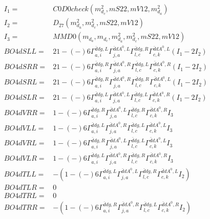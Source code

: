 \documentclass[A4,landscape]{article}
\begin{document}
\begin{align} 
I_1 = & C0D0check(m^2_{d_{{c}}}, mS22, mV12, m^2_{d_{{a}}}) \\ 
I_2 = & D_{27}(m^2_{d_{{a}}}, m^2_{d_{{c}}}, mS22, mV12) \\ 
I_3 = & MMD0(m_{d_{{a}}}, m_{d_{{c}}}, m^2_{d_{{a}}}, m^2_{d_{{c}}}, mS22, mV12) \\ 
  BO4dSLL= & 2   1
-(-)
  6 \Gamma^{\bar{d}d g ,L}_{a, i} \Gamma^{\bar{d}d A^0 ,L}_{j, a} \Gamma^{\bar{d}d g ,R}_{l, c} \Gamma^{\bar{d}d A^0 ,L}_{c, k} (I_1 - 2 I_2) \\ 
  BO4dSRR= & 2   1
-(-)
  6 \Gamma^{\bar{d}d g ,R}_{a, i} \Gamma^{\bar{d}d A^0 ,R}_{j, a} \Gamma^{\bar{d}d g ,L}_{l, c} \Gamma^{\bar{d}d A^0 ,R}_{c, k} (I_1 - 2 I_2) \\ 
  BO4dSRL= & 2   1
-(-)
  6 \Gamma^{\bar{d}d g ,R}_{a, i} \Gamma^{\bar{d}d A^0 ,R}_{j, a} \Gamma^{\bar{d}d g ,R}_{l, c} \Gamma^{\bar{d}d A^0 ,L}_{c, k} (I_1 - 2 I_2) \\ 
  BO4dSLR= & 2   1
-(-)
  6 \Gamma^{\bar{d}d g ,L}_{a, i} \Gamma^{\bar{d}d A^0 ,L}_{j, a} \Gamma^{\bar{d}d g ,L}_{l, c} \Gamma^{\bar{d}d A^0 ,R}_{c, k} (I_1 - 2 I_2) \\ 
  BO4dVRR= &   1
-(-)
  6 \Gamma^{\bar{d}d g ,R}_{a, i} \Gamma^{\bar{d}d A^0 ,L}_{j, a} \Gamma^{\bar{d}d g ,R}_{l, c} \Gamma^{\bar{d}d A^0 ,R}_{c, k} I_3 \\ 
  BO4dVLL= &   1
-(-)
  6 \Gamma^{\bar{d}d g ,L}_{a, i} \Gamma^{\bar{d}d A^0 ,R}_{j, a} \Gamma^{\bar{d}d g ,L}_{l, c} \Gamma^{\bar{d}d A^0 ,L}_{c, k} I_3 \\ 
  BO4dVRL= &   1
-(-)
  6 \Gamma^{\bar{d}d g ,R}_{a, i} \Gamma^{\bar{d}d A^0 ,L}_{j, a} \Gamma^{\bar{d}d g ,L}_{l, c} \Gamma^{\bar{d}d A^0 ,L}_{c, k} I_3 \\ 
  BO4dVLR= &   1
-(-)
  6 \Gamma^{\bar{d}d g ,L}_{a, i} \Gamma^{\bar{d}d A^0 ,R}_{j, a} \Gamma^{\bar{d}d g ,R}_{l, c} \Gamma^{\bar{d}d A^0 ,R}_{c, k} I_3 \\ 
  BO4dTLL= & -(  1
-(-)
  6 \Gamma^{\bar{d}d g ,L}_{a, i} \Gamma^{\bar{d}d A^0 ,L}_{j, a} \Gamma^{\bar{d}d g ,R}_{l, c} \Gamma^{\bar{d}d A^0 ,L}_{c, k} I_2) \\ 
  BO4dTLR= & 0 \\ 
  BO4dTRL= & 0 \\ 
  BO4dTRR= & -(  1
-(-)
  6 \Gamma^{\bar{d}d g ,R}_{a, i} \Gamma^{\bar{d}d A^0 ,R}_{j, a} \Gamma^{\bar{d}d g ,L}_{l, c} \Gamma^{\bar{d}d A^0 ,R}_{c, k} I_2) \\ 
\end{align} 
\end{document}
